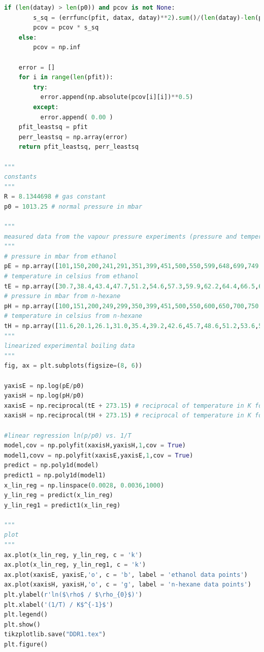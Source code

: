 \documentclass[a4paper,abstracton]{article}	                       %
\begin{document}
\begin{lstlisting}[language=Python]
    if (len(datay) > len(p0)) and pcov is not None:
        s_sq = (errfunc(pfit, datax, datay)**2).sum()/(len(datay)-len(p0))
        pcov = pcov * s_sq
    else:
        pcov = np.inf

    error = [] 
    for i in range(len(pfit)):
        try:
          error.append(np.absolute(pcov[i][i])**0.5)
        except:
          error.append( 0.00 )
    pfit_leastsq = pfit
    perr_leastsq = np.array(error) 
    return pfit_leastsq, perr_leastsq 

"""   
constants
"""
R = 8.1344698 # gas constant
p0 = 1013.25 # normal pressure in mbar
        
"""
measured data from the vapour pressure experiments (pressure and temperatures)
"""
# pressure in mbar from ethanol
pE = np.array([101,150,200,241,291,351,399,451,500,550,599,648,699,749,799,851,898,948,899,849,799,749,699,649,599,549,499,449,400,349,301])
# temperature in celsius from ethanol
tE = np.array([30.7,38.4,43.4,47.7,51.2,54.6,57.3,59.9,62.2,64.4,66.5,68.3,70.1,71.3,73.2,74.4,75.9,77.3,75.9,74.4,72.9,71.3,69.7,68.1,66.0,64.2,62.0,59.7,57.2,54.4,51.2])
# pressure in mbar from n-hexane
pH = np.array([100,151,200,249,299,350,399,451,500,550,600,650,700,750,800,848,898,946,900,849,800,750,701,650,601,549,499,450,400,350])
# temperature in celsius from n-hexane
tH = np.array([11.6,20.1,26.1,31.0,35.4,39.2,42.6,45.7,48.6,51.2,53.6,56.0,58.1,60.1,62.1,63.8,65.6,67.2,65.7,63.7,61.9,60.0,57.9,55.8,53.5,51.0,48.5,45.7,42.7,39.2])
"""
linearized experimental boiling data
"""
fig, ax = plt.subplots(figsize=(8, 6))

yaxisE = np.log(pE/p0)
yaxisH = np.log(pH/p0)
xaxisE = np.reciprocal(tE + 273.15) # reciprocal of temperature in K for ethanol [1/K]
xaxisH = np.reciprocal(tH + 273.15) # reciprocal of temperature in K for n-hexane [1/K]

#linear regression ln(p/p0) vs. 1/T
model,cov = np.polyfit(xaxisH,yaxisH,1,cov = True)
model1,covv = np.polyfit(xaxisE,yaxisE,1,cov = True)
predict = np.poly1d(model)
predict1 = np.poly1d(model1)
x_lin_reg = np.linspace(0.0028, 0.0036,1000)
y_lin_reg = predict(x_lin_reg)
y_lin_reg1 = predict1(x_lin_reg)

"""
plot 
"""
ax.plot(x_lin_reg, y_lin_reg, c = 'k')
ax.plot(x_lin_reg, y_lin_reg1, c = 'k')
ax.plot(xaxisE, yaxisE,'o', c = 'b', label = 'ethanol data points')
ax.plot(xaxisH, yaxisH,'o', c = 'g', label = 'n-hexane data points')
plt.ylabel(r'ln($\rho$ / $\rho_{0}$)')
plt.xlabel('(1/T) / K$^{-1}$')
plt.legend()
plt.show()
tikzplotlib.save("DDR1.tex")
plt.figure()


\end{lstlisting}
\end{document}
